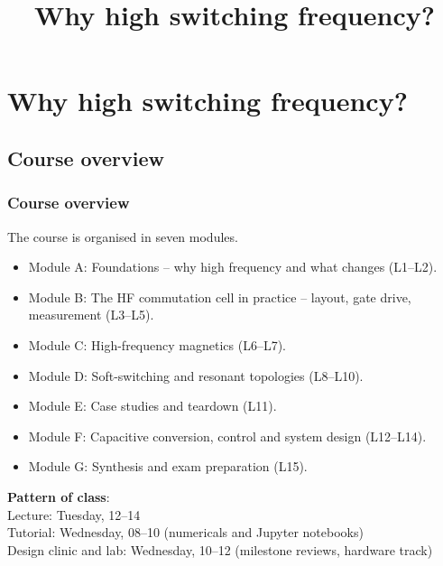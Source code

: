 \section{Why high switching frequency?}
\title[Why high switching frequency?]{Why high switching frequency?}

\begin{frame}[plain]
	\titlepage
\end{frame}

\subsection{Course overview}

\begin{frame}
	\frametitle{Course overview}
	The course is organised in seven modules.
	\begin{itemize}
		\item Module A: Foundations -- why high frequency and what changes (L1--L2).
		\item Module B: The HF commutation cell in practice -- layout, gate drive, measurement (L3--L5).
		\item Module C: High-frequency magnetics (L6--L7).
		\item Module D: Soft-switching and resonant topologies (L8--L10).
		\item Module E: Case studies and teardown (L11).
		\item Module F: Capacitive conversion, control and system design (L12--L14).
		\item Module G: Synthesis and exam preparation (L15).
	\end{itemize}
	\textbf{Pattern of class}: \\
	Lecture: Tuesday, 12--14 \\
	Tutorial: Wednesday, 08--10 (numericals and Jupyter notebooks) \\
	Design clinic and lab: Wednesday, 10--12 (milestone reviews, hardware track)
\end{frame}

